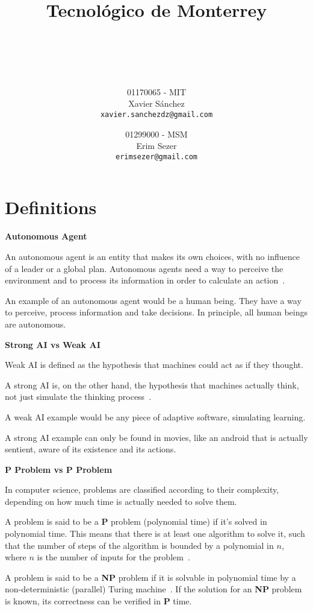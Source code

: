 \documentclass[titlepage, letterpaper, fleqn]{article}
\title{
    \vspace{1in}
    \textbf{Tecnológico de Monterrey} \\
    \vspace{0.5in}
    \textmd{\mahclass} \\
    \large{\textit{\mahteacher}} \\
    \vspace{0.5in}
    \textsc{\mahtitle}
    \author{01170065  - MIT \\
    Xavier Sánchez \\
    \texttt{xavier.sanchezdz@gmail.com}
    \and
    01299000 - MSM \\
    Erim Sezer \\
    \texttt{erimsezer@gmail.com}
    }
    \date{\mahdate}
}
\newcommand{\spacepls}{\vspace{5mm}}
\newcommand{\defy}[1]{
	\textbf{#1} %
}
\newcommand{\defys}[1]{
	\spacepls %
	\textbf{#1}
}
\begin{document}
\begin{titlepage}
\maketitle
\end{titlepage}

%
%

\section{Definitions}
\label{sec:defs}

\defy{Autonomous Agent}

An autonomous agent is an entity that makes its own choices, with no influence of a leader or a global plan.
Autonomous agents need a way to perceive the environment and to process its information in order to calculate an action~\cite{Shiffman}.

An example of an autonomous agent would be a human being. They have a way to perceive, process information and take decisions. In principle, all human beings are autonomous.

\defys{Strong AI vs Weak AI}

Weak AI is defined as the hypothesis that machines could act as if they thought.

A strong AI is, on the other hand, the hypothesis that machines actually think, not just simulate the thinking process~\cite{StrongAI}.

A weak AI example would be any piece of adaptive software, simulating learning.

A strong AI example can only be found in movies, like an android that is actually sentient, aware of its existence and its actions.

\defys{P Problem vs P Problem}

In computer science, problems are classified according to their complexity, depending on how much time is actually needed to solve them.

A problem is said to be a \textbf{P} problem (polynomial time) if it's solved in polynomial time. This means that there is at least one algorithm to solve it, such that the number of steps of the algorithm is bounded by a polynomial in \(n\), where \(n\) is the number of inputs for the problem~\cite{PProblem}.

A problem is said to be a \textbf{NP} problem if it is solvable in polynomial time by a non-deterministic (parallel) Turing machine~\cite{NPProblem}. If the solution for an \textbf{NP} problem is known, its correctness can be verified in \textbf{P} time.
\end{document}
